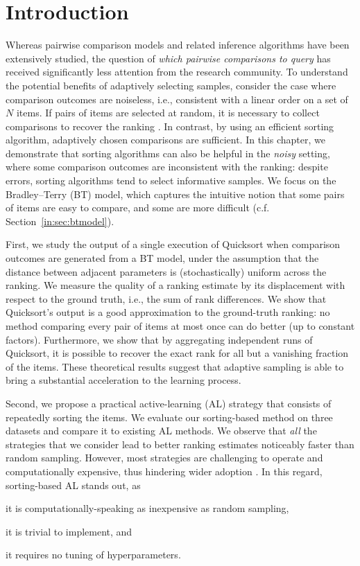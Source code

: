 \section{Introduction}  %
\label{rs:sec:intro}

Whereas pairwise comparison models and related inference algorithms have been extensively studied, the question of \emph{which pairwise comparisons to query} has received significantly less attention from the research community.
To understand the potential benefits of adaptively selecting samples, consider the case where comparison outcomes are noiseless, i.e., consistent with a linear order on a set of $N$ items.
If pairs of items are selected at random, it is necessary to collect  comparisons to recover the ranking \citep{alon1994linear}.
In contrast, by using an efficient sorting algorithm,  adaptively chosen comparisons are sufficient.
In this chapter, we demonstrate that sorting algorithms can also be helpful in the \emph{noisy} setting, where some comparison outcomes are inconsistent with the ranking: despite errors, sorting algorithms tend to select informative samples.
We focus on the Bradley--Terry (BT) model, which captures the intuitive notion that some pairs of items are easy to compare, and some are more difficult (c.f. Section~\ref{in:sec:btmodel}).

First, we study the output of a single execution of Quicksort when comparison outcomes are generated from a BT model, under the assumption that the distance between adjacent parameters is (stochastically) uniform across the ranking.
We measure the quality of a ranking estimate by its displacement with respect to the ground truth, i.e., the sum of rank differences.
We show that Quicksort's output is a good approximation to the ground-truth ranking: no method comparing every pair of items at most once can do better (up to constant factors).
Furthermore, we show that by aggregating  independent runs of Quicksort, it is possible to recover the exact rank for all but a vanishing fraction of the items.
These theoretical results suggest that adaptive sampling is able to bring a substantial acceleration to the learning process.

Second, we propose a practical active-learning (AL) strategy that consists of repeatedly sorting the items.
We evaluate our sorting-based method on three datasets and compare it to existing AL methods.
We observe that \emph{all} the strategies that we consider lead to better ranking estimates noticeably faster than random sampling.
However, most strategies are challenging to operate and computationally expensive, thus hindering wider adoption \citep{schein2007active}.
In this regard, sorting-based AL stands out, as
\begin{enuminline}
\item it is computationally-speaking as inexpensive as random sampling, 
\item it is trivial to implement, and
\item it requires no tuning of hyperparameters.
\end{enuminline}

